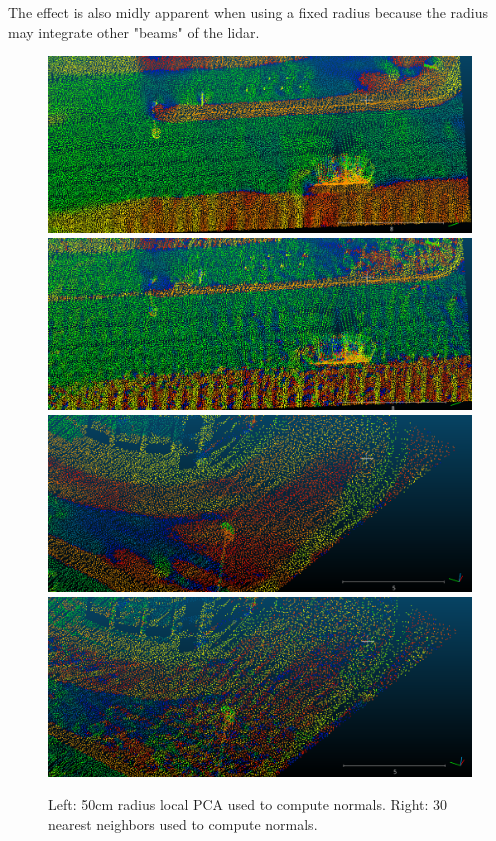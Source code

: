 \documentclass[a4paper]{article}
\begin{document}
The effect is also midly apparent when using a fixed radius because the radius may integrate other "beams" of the lidar.


\begin{figure}[ht]
  \centering
  \includegraphics[width=0.46\linewidth]{figures/cc_normals_PCA_r=50cm_smooth.png}
  \includegraphics[width=0.46\linewidth]{figures/cc_normals_PCA_50cm_k=30_nearest.png}
  \includegraphics[width=0.46\linewidth]{figures/cc_normals_PCA_r=50cm_v2.png}
  \includegraphics[width=0.46\linewidth]{figures/cc_normals_PCA_50cm_k=30_v2.png}
  \caption{Left: 50cm radius local PCA used to compute normals. 
  Right: 30 nearest neighbors used to compute normals.} 
  \label{fig:local_PCA_neighbor}
\end{figure}
\end{document}
